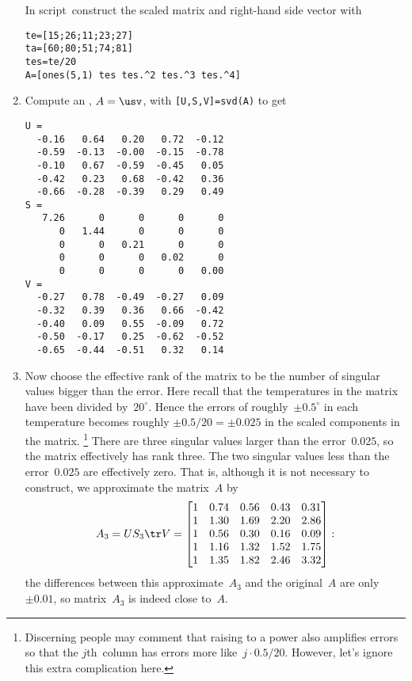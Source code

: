 \begin{example}
\begin{solution}
\begin{enumerate}
In script\ construct the scaled matrix and right-hand side vector with 
\begin{verbatim}
te=[15;26;11;23;27]
ta=[60;80;51;74;81]
tes=te/20
A=[ones(5,1) tes tes.^2 tes.^3 tes.^4]
\end{verbatim}
\setbox\ajrqrbox\hbox{}%
\marginajrbox%

\item Compute an \svd, \(A=\usv\), with \verb|[U,S,V]=svd(A)| to get \twodp
\begin{verbatim}
U =
  -0.16   0.64   0.20   0.72  -0.12
  -0.59  -0.13  -0.00  -0.15  -0.78
  -0.10   0.67  -0.59  -0.45   0.05
  -0.42   0.23   0.68  -0.42   0.36
  -0.66  -0.28  -0.39   0.29   0.49
S =
   7.26      0      0      0      0
      0   1.44      0      0      0
      0      0   0.21      0      0
      0      0      0   0.02      0
      0      0      0      0   0.00
V =
  -0.27   0.78  -0.49  -0.27   0.09
  -0.32   0.39   0.36   0.66  -0.42
  -0.40   0.09   0.55  -0.09   0.72
  -0.50  -0.17   0.25  -0.62  -0.52
  -0.65  -0.44  -0.51   0.32   0.14
\end{verbatim}

\item Now choose the effective rank of the matrix to be the number of singular values bigger than the error.
Here recall that the temperatures in the matrix have been divided by~\(20^\circ\).
Hence the errors of roughly~\(\pm0.5^\circ\) in each temperature becomes roughly \(\pm0.5/20=\pm0.025\) in the scaled components in the matrix.%
\footnote{Discerning people may comment that raising to a power also amplifies errors so that the \(j\)th~column has errors more like~\(j\cdot0.5/20\).  However, let's ignore this extra complication here.}
There are three singular values larger than the error~\(0.025\), so the matrix effectively has rank three.
The two singular values less than the error~\(0.025\) are effectively zero.
That is, although it is not necessary to construct, we approximate the matrix~\(A\) by \twodp
\begin{equation*}
A_3=US_3\tr V=\begin{bmatrix} 1&0.74&0.56&0.43&0.31
\\1&1.30&1.69&2.20&2.86
\\1&0.56&0.30&0.16&0.09
\\1&1.16&1.32&1.52&1.75
\\1&1.35&1.82&2.46&3.32 \end{bmatrix}:
\end{equation*}
the differences between this approximate~\(A_3\) and the original~\(A\) are only~\(\pm0.01\), so matrix~\(A_3\) is indeed close to~\(A\).


\end{enumerate}
\end{solution}
\end{example}
